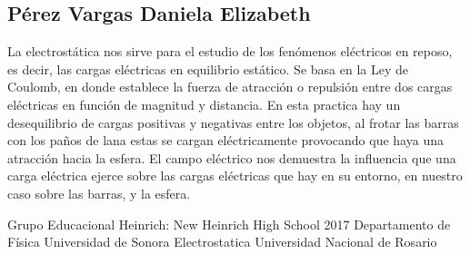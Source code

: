 \documentclass[14pt]{article}
\begin{document}
\subsection{Pérez Vargas Daniela Elizabeth}
La electrostática nos sirve para el estudio de los fenómenos eléctricos en reposo, es decir, las cargas eléctricas en equilibrio estático. Se basa en la Ley de Coulomb, en donde establece la fuerza de atracción o repulsión entre dos cargas eléctricas en función de magnitud y distancia. En esta practica hay un desequilibrio de cargas positivas y negativas entre los objetos, al frotar las barras con los paños de lana estas se cargan eléctricamente provocando que haya una atracción hacia la esfera. El campo eléctrico nos demuestra la influencia que una carga eléctrica ejerce sobre las cargas eléctricas que hay en su entorno, en nuestro caso sobre las barras, y la esfera.

	\newpage
	\begin{thebibliography}{0}
		Grupo Educacional Heinrich:
		New Heinrich High School
		2017 Departamento de Física
		Universidad de Sonora
		Electrostatica Universidad Nacional de Rosario 
	\end{thebibliography}
\end{document}
